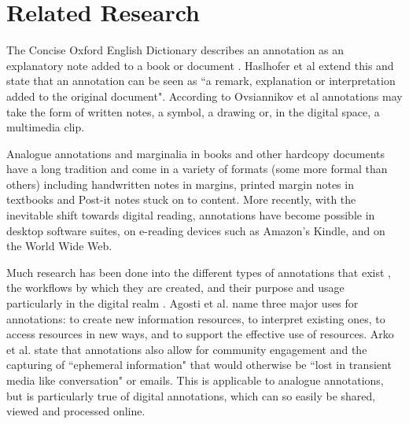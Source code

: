 
\chapter{Related Research} %

\label{Chapter3} %







The Concise Oxford English Dictionary describes an annotation as an explanatory note added to a book or document \citep{OxfordDict}. Haslhofer et al \citep{LEMO} extend this and state that an annotation can be seen as ``a remark, explanation or interpretation added to the original document". According to Ovsiannikov et al \citep{Ovsiannikov} annotations may take the form of written notes, a symbol, a drawing or, in the digital space, a multimedia clip. 

Analogue annotations and marginalia in books and other hardcopy documents have a long tradition \citep{LEMO} and come in a variety of formats (some more formal than others) including handwritten notes in margins, printed margin notes in textbooks and Post-it notes stuck on to content. More recently, with the inevitable shift towards digital reading, annotations have become possible in desktop software suites, on e-reading devices such as Amazon's Kindle, and on the World Wide Web. 

Much research has been done into the different types of annotations that exist \citep{Marshall2000} \citep{Marshall2004}, the workflows by which they are created, and their purpose and usage  particularly in the digital realm \citep{Agosti} \citep{Ovsiannikov}. Agosti et al. \citep{Agosti} name three major uses for annotations: to create new information resources, to interpret existing ones, to access resources in new ways, and to support the effective use of resources.  Arko et al. \citep{Arko} state that annotations also allow for community engagement and the capturing of ``ephemeral information" that would otherwise be ``lost in transient media like conversation" or emails. This is applicable to analogue annotations, but is particularly true of digital annotations, which can so easily be shared, viewed and processed online.

